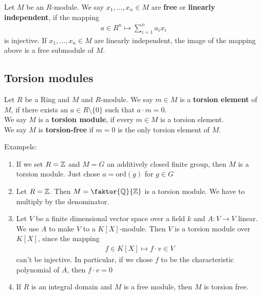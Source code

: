 \begin{definition}[]
	Let $M$ be an $R$-module. We say $x_{1}, \ldots, x_{n} \in M$ are \textbf{free} or \textbf{linearly independent}, if the mapping
	\begin{align*}
		a \in R^{n} \mapsto \sum_{i = 1}^{n} a_i x_i
	\end{align*}
	is injective. If $x_{1}, \ldots, x_{n} \in M$ are linearly independent, the image of the mapping above is a free submodule of $M$.
\end{definition}

\subsection{Torsion modules}
\begin{definition}[]
	Let $R$ be a Ring and $M$ and $R$-module. We say $m \in M$ is a \textbf{torsion element} of $M$, if there exists an $a \in R \setminus \{0\}$ such that $a \cdot m = 0$.\\

	We say $M$ is a \textbf{torsion module}, if every $m \in M$ is a torsion element.\\

	We say $M$ is \textbf{torsion-free} if $m = 0$ is the only torsion element of $M$.
\end{definition}


Exampels:
\begin{enumerate}
	\item If we set $R = \mathbb{Z}$ and $M = G$ an additively closed finite group, then $M$ is a torsion module. Just chose $a = \text{ord}(g)$ for $g \in G$
	\item Let $R = \mathbb{Z}$. Then $M = \faktor{\Q}{\Z}$ is a torsion module. We have to multiply by the denominator.
	\item Let $V$ be a finite dimensional vector space over a field $k$ and $A: V \to V$ linear. We use $A$ to make $V$ to a $K[X]$-module. Then $V$ is a torsion module over $K[X]$, since the mapping
		\begin{align*}
			f \in K[X] \mapsto f \cdot v \in V 
		\end{align*}
		can't be injective. In particular, if we chose $f$ to be the characteristic polynomial of $A$, then $f \cdot v = 0$
	\item If $R$ is an integral domain and $M$ is a free module, then $M$ is torsion free.
\end{enumerate}



